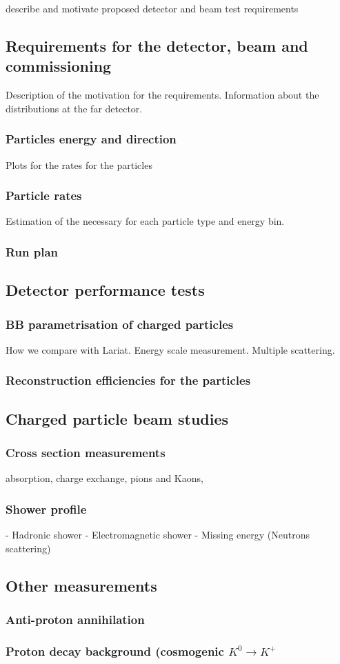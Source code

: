 describe and motivate proposed detector and beam test requirements 


\subsection{Requirements for the detector, beam and commissioning}
Description of the motivation for the requirements. Information about the distributions at the far detector. 

\subsubsection{Particles energy and direction}
Plots for the  rates for the particles
\subsubsection{Particle rates}
Estimation of the necessary for each particle type and energy bin. 
\subsubsection {Run plan}


\subsection{Detector performance tests}
\subsubsection{BB parametrisation of charged particles}
How we compare with Lariat. Energy scale measurement. 
Multiple scattering.  

\subsubsection{Reconstruction efficiencies for the particles}


\subsection{Charged particle beam studies}
\subsubsection{Cross section measurements}
absorption, charge exchange, pions and Kaons, 

\subsubsection{Shower profile}
- Hadronic shower
- Electromagnetic shower
- Missing energy (Neutrons scattering)
 

\subsection{Other measurements} 
\subsubsection{Anti-proton annihilation }
\subsubsection{Proton decay background (cosmogenic $K^{0} \to K^+$}
